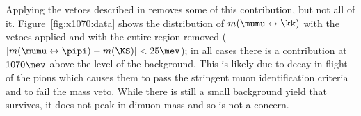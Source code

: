 

Applying the \KS vetoes described in  removes
some of this contribution, but not all of it.
Figure~\ref{fig:x1070:data} shows the distribution of $m(\mumu\leftrightarrow\kk)$ with
the \KS vetoes applied and with the entire \KS region removed ($|m(\mumu\leftrightarrow\pipi)-m(\KS)|<25\mev$); in all
cases there is a contribution at $1070\mev$ above the level of the background.
This is likely due to decay in flight of the pions which causes them to pass the stringent muon identification criteria and to fail the \KS mass veto.
While there is still a small background yield that survives, it does not peak in dimuon mass and so is not a concern.











